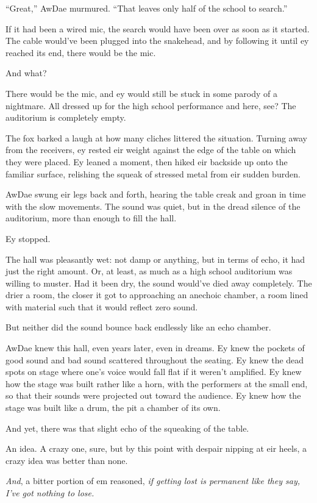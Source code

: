 ``Great,'' AwDae murmured. ``That leaves only half of the school to search.''

If it had been a wired mic, the search would have been over as soon as it started. The cable would've been plugged into the snakehead, and by following it until ey reached its end, there would be the mic.

And what?

There would be the mic, and ey would still be stuck in some parody of a nightmare. All dressed up for the high school performance and here, see? The auditorium is completely empty.

The fox barked a laugh at how many cliches littered the situation. Turning away from the receivers, ey rested eir weight against the edge of the table on which they were placed. Ey leaned a moment, then hiked eir backside up onto the familiar surface, relishing the squeak of stressed metal from eir sudden burden.

AwDae swung eir legs back and forth, hearing the table creak and groan in time with the slow movements. The sound was quiet, but in the dread silence of the auditorium, more than enough to fill the hall.

Ey stopped.

The hall was pleasantly wet: not damp or anything, but in terms of echo, it had just the right amount. Or, at least, as much as a high school auditorium was willing to muster. Had it been dry, the sound would've died away completely. The drier a room, the closer it got to approaching an anechoic chamber, a room lined with material such that it would reflect zero sound.

But neither did the sound bounce back endlessly like an echo chamber.

AwDae knew this hall, even years later, even in dreams. Ey knew the pockets of good sound and bad sound scattered throughout the seating. Ey knew the dead spots on stage where one's voice would fall flat if it weren't amplified. Ey knew how the stage was built rather like a horn, with the performers at the small end, so that their sounds were projected out toward the audience. Ey knew how the stage was built like a drum, the pit a chamber of its own.

And yet, there was that slight echo of the squeaking of the table.

An idea. A crazy one, sure, but by this point with despair nipping at eir heels, a crazy idea was better than none.

\emph{And}, a bitter portion of em reasoned, \emph{if getting lost is permanent like they say, I've got nothing to lose.}

